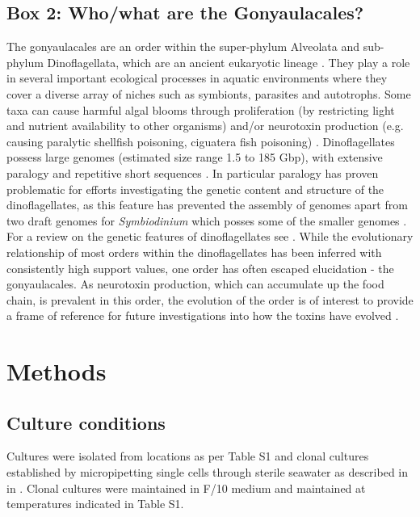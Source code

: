 \documentclass[fleqn,10pt,lineno]{wlpeerj} %
\begin{document}
\subsection*{Box 2: Who/what are the Gonyaulacales?}
\label{sec:dinobox}
The gonyaulacales are an order within the super-phylum Alveolata and sub-phylum Dinoflagellata, which are an ancient eukaryotic lineage \cite{moldowan1998biogeochemical}. 
They play a role in several important ecological processes in aquatic environments where they cover a diverse array of niches such as symbionts, parasites and autotrophs. 
Some taxa can cause harmful algal blooms through proliferation (by restricting light and nutrient availability to other organisms) and/or neurotoxin production (e.g. causing paralytic shellfish poisoning, ciguatera fish poisoning) \cite{murray2016unravelling}.
Dinoflagellates possess large genomes (estimated size range 1.5 to 185 Gbp), with extensive paralogy and repetitive short sequences  \cite{casabianca2017genome}. 
In particular paralogy has proven problematic for efforts investigating the genetic content and structure of the dinoflagellates, as this feature has prevented the assembly of genomes apart from two draft genomes for \textit{Symbiodinium} which posses some of the smaller genomes \cite{shoguchi2013draft,lin2015symbiodinium}. 
For a review on the genetic features of dinoflagellates see \cite{murray2016unravelling}.
While the evolutionary relationship of most orders within the dinoflagellates has been inferred with consistently high support values, one order has often escaped elucidation - the gonyaulacales. 
As neurotoxin production, which can accumulate up the food chain, is prevalent in this order, the evolution of the order is of interest to provide a frame of reference for future investigations into how the toxins have evolved \cite{shalchian2006combined,zhang2007three,saldarriaga2004molecular,hoppenrath2010dinoflagellate,murray2005improving}. 

\section*{Methods}
\subsection*{Culture conditions}
Cultures were isolated from locations as per Table S1 and clonal cultures established by micropipetting single cells through sterile seawater as described in in \cite{kretzschmar2017characterization}. 
Clonal cultures were maintained in F/10 medium \cite{holmes1991strain} and maintained at temperatures indicated in Table S1. %
\end{document}
